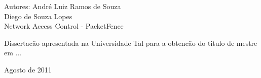 %


%

\begin{titlepage}
 \vfill
 \begin{center}
{\large Autores: André Luiz Ramos de Souza \\ Diego de Souza Lopes} \\[5cm]
{\huge Network Access Control - PacketFence}\\[1cm] \hspace{.45\textwidth} %
\begin{espacosimples}
Dissertacão apresentada na Universidade Tal para a obtencão do titulo de mestre em ...
\end{espacosimples}
\vfill
Agosto de 2011
\end{center}
\end{titlepage}
